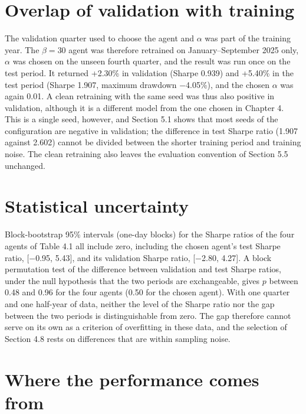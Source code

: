 \documentclass[12pt,a4paper]{report}
\begin{document}
\section{Overlap of validation with
training}\label{overlap-of-validation-with-training}

The validation quarter used to choose the agent and \(\alpha\) was part
of the training year. The \(\beta=30\) agent was therefore retrained on
January--September 2025 only, \(\alpha\) was chosen on the unseen fourth
quarter, and the result was run once on the test period. It returned
+2.30\% in validation (Sharpe 0.939) and +5.40\% in the test period
(Sharpe 1.907, maximum drawdown −4.05\%), and the chosen \(\alpha\) was
again 0.01. A clean retraining with the same seed was thus also positive
in validation, although it is a different model from the one chosen in
Chapter 4. This is a single seed, however, and Section 5.1 shows that
most seeds of the configuration are negative in validation; the
difference in test Sharpe ratio (1.907 against 2.602) cannot be divided
between the shorter training period and training noise. The clean
retraining also leaves the evaluation convention of Section 5.5
unchanged.

\section{Statistical uncertainty}\label{statistical-uncertainty}

Block-bootstrap 95\% intervals (one-day blocks) for the Sharpe ratios of
the four agents of Table 4.1 all include zero, including the chosen
agent's test Sharpe ratio, {[}−0.95, 5.43{]}, and its validation Sharpe
ratio, {[}−2.80, 4.27{]}. A block permutation test of the difference
between validation and test Sharpe ratios, under the null hypothesis
that the two periods are exchangeable, gives \(p\) between 0.48 and 0.96
for the four agents (0.50 for the chosen agent). With one quarter and
one half-year of data, neither the level of the Sharpe ratio nor the gap
between the two periods is distinguishable from zero. The gap therefore
cannot serve on its own as a criterion of overfitting in these data, and
the selection of Section 4.8 rests on differences that are within
sampling noise.

\section{Where the performance comes
from}\label{where-the-performance-comes-from}
\end{document}
